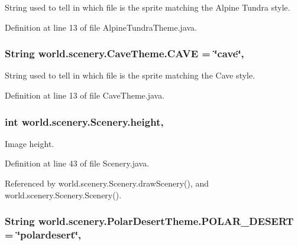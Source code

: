 String used to tell in which file is the sprite matching the Alpine Tundra style. 



Definition at line 13 of file Alpine\-Tundra\-Theme.\-java.

\hypertarget{interfaceworld_1_1scenery_1_1_cave_theme_abbad3655c1d1f230dddfd7ecc5194f50}{
\subsubsection[{C\-A\-V\-E}]{\setlength{\rightskip}{0pt plus 5cm}String world.\-scenery.\-Cave\-Theme.\-C\-A\-V\-E = \char`\"{}cave\char`\"{}\hspace{0.3cm}{\ttfamily [static]}, {\ttfamily [inherited]}}}\label{interfaceworld_1_1scenery_1_1_cave_theme_abbad3655c1d1f230dddfd7ecc5194f50}


String used to tell in which file is the sprite matching the Cave style. 



Definition at line 13 of file Cave\-Theme.\-java.

\hypertarget{classworld_1_1scenery_1_1_scenery_a54b4edfa060087e78a829105bf62a900}{
\subsubsection[{height}]{\setlength{\rightskip}{0pt plus 5cm}int world.\-scenery.\-Scenery.\-height\hspace{0.3cm}{\ttfamily [protected]}, {\ttfamily [inherited]}}}\label{classworld_1_1scenery_1_1_scenery_a54b4edfa060087e78a829105bf62a900}


Image height. 



Definition at line 43 of file Scenery.\-java.



Referenced by world.\-scenery.\-Scenery.\-draw\-Scenery(), and world.\-scenery.\-Scenery.\-Scenery().

\hypertarget{interfaceworld_1_1scenery_1_1_polar_desert_theme_a48dd1801e0146ea2306dadcbdee81b77}{
\subsubsection[{P\-O\-L\-A\-R\-\_\-\-D\-E\-S\-E\-R\-T}]{\setlength{\rightskip}{0pt plus 5cm}String world.\-scenery.\-Polar\-Desert\-Theme.\-P\-O\-L\-A\-R\-\_\-\-D\-E\-S\-E\-R\-T = \char`\"{}polardesert\char`\"{}\hspace{0.3cm}{\ttfamily [static]}, {\ttfamily [inherited]}}}\label{interfaceworld_1_1scenery_1_1_polar_desert_theme_a48dd1801e0146ea2306dadcbdee81b77}


